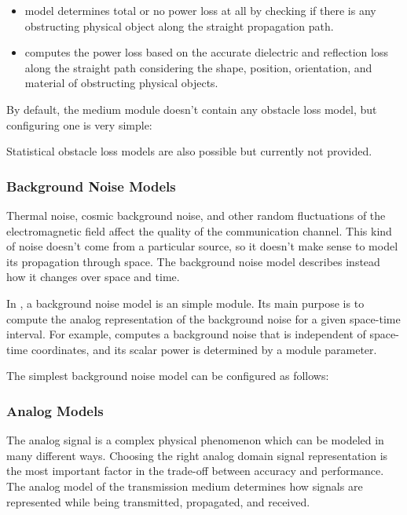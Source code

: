 \begin{itemize}
        \item {} model determines total or no power loss at all by checking if there is any obstructing physical object along the straight propagation path.
        \item {} computes the power loss based on the accurate dielectric and reflection loss along the straight path considering the shape, position, orientation, and material of obstructing physical objects.
\end{itemize}

By default, the medium module doesn't contain any obstacle loss model, but configuring one is very simple:


Statistical obstacle loss models are also possible but currently not provided.

\subsubsection*{Background Noise Models}

Thermal noise, cosmic background noise, and other random fluctuations of the electromagnetic field affect the quality of the communication channel. This kind of noise doesn’t come from a particular source, so it doesn’t make sense to model its propagation through space. The background noise model describes instead how it changes over space and time.

In \inet, a background noise model is an \omnet simple module. Its main purpose is to compute the analog representation of the background noise for a given space-time interval. For example,  computes a background noise that is independent of space-time coordinates, and its scalar power is determined by a module parameter.

The simplest background noise model can be configured as follows:


\subsubsection*{Analog Models}

The analog signal is a complex physical phenomenon which can be modeled in many different ways. Choosing the right analog domain signal representation is the most important factor in the trade-off between accuracy and performance. The analog model of the transmission medium determines how signals are represented while being transmitted, propagated, and received.

